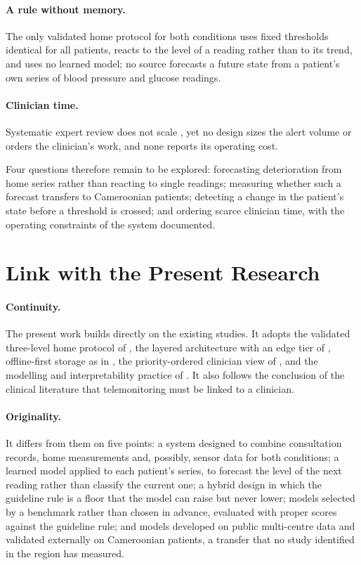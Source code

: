 \paragraph{A rule without memory.} The only validated home protocol for both conditions \parencite{mihevc2025} uses fixed thresholds identical for all patients, reacts to the level of a reading rather than to its trend, and uses no learned model; no source forecasts a future state from a patient's own series of blood pressure and glucose readings.

\paragraph{Clinician time.} Systematic expert review does not scale \parencite{kingue2013,bediang2021}, yet no design sizes the alert volume or orders the clinician's work, and none reports its operating cost.

Four questions therefore remain to be explored: forecasting deterioration from home series rather than reacting to single readings; measuring whether such a forecast transfers to Cameroonian patients; detecting a change in the patient's state before a threshold is crossed; and ordering scarce clinician time, with the operating constraints of the system documented.

\section{Link with the Present Research}\label{sec:research-questions}\label{sec:link}

\paragraph{Continuity.} The present work builds directly on the existing studies. It adopts the validated three-level home protocol of \textcite{mihevc2025}, the layered architecture with an edge tier of \textcite{mucchi2021}, offline-first storage as in \textcite{efendi2025}, the priority-ordered clinician view of \textcite{yazdani2018}, and the modelling and interpretability practice of \textcite{mendoza2025}. It also follows the conclusion of the clinical literature that telemonitoring must be linked to a clinician.

\paragraph{Originality.} It differs from them on five points: a system designed to combine consultation records, home measurements and, possibly, sensor data for both conditions; a learned model applied to each patient's series, to forecast the level of the next reading rather than classify the current one; a hybrid design in which the guideline rule is a floor that the model can raise but never lower; models selected by a benchmark rather than chosen in advance, evaluated with proper scores against the guideline rule; and models developed on public multi-centre data and validated externally on Cameroonian patients, a transfer that no study identified in the region has measured.

